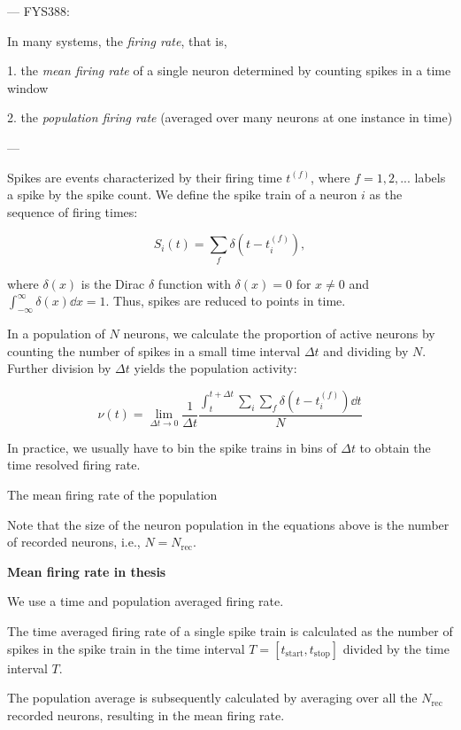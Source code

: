 ---
FYS388: 

In many systems, the \textit{firing rate}, that is, 

1. the \textit{mean firing rate} of a single neuron determined by counting spikes in a time window 

2. the \textit{population firing rate} (averaged over many neurons at one instance in time) 

---

Spikes are events characterized by their firing time $t^{(f)}$, where $f=1, 2, ...$ labels a spike by the spike count. We define the spike train of a neuron $i$ as the sequence of firing times: 

\begin{equation}
    S_i(t) = \sum_f \delta \left(t - t_i^{(f)} \right),
\end{equation}

where $\delta(x)$ is the Dirac $\delta$ function with $\delta(x)=0$ for $x \neq 0$ and $\int_{-\infty}^\infty \delta (x) \dd{x} = 1$. Thus, spikes are reduced to points in time. 

In a population of $N$ neurons, we calculate the proportion of active neurons by counting the number of spikes in a small time interval $\Delta t$ and dividing by $N$. Further division by $\Delta t$ yields the population activity:

\begin{equation}
    \nu (t) = \lim_{\Delta t \to 0} \frac{1}{\Delta t} \frac{\int_{t}^{t + \Delta t} \sum_i \sum_f \delta \left(t - t_i^{(f)} \right) \dd{t}}{N}
\end{equation} 

In practice, we usually have to bin the spike trains in bins of $\Delta t$ to obtain the time resolved firing rate. 

The mean firing rate of the population  


Note that the size of the neuron population in the equations above is the number of recorded neurons, i.e., $N = N_\mathrm{rec}$.

\textbf{Mean firing rate in thesis}

We use a time and population averaged firing rate. 

The time averaged firing rate of a single spike train is calculated as the number of spikes in the spike train in the time interval $T = [t_\mathrm{start}, t_\mathrm{stop}]$ divided by the time interval $T$. 

The population average is subsequently calculated by averaging over all the $N_\mathrm{rec}$ recorded neurons, resulting in the mean firing rate.  

